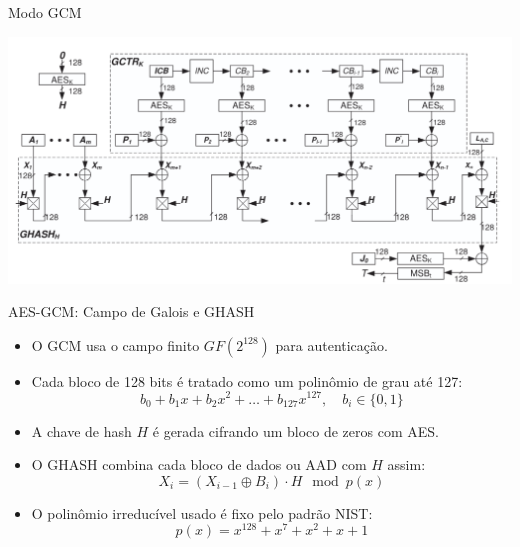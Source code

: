 \begin{frame}{Modo GCM}


    \centering
    \includegraphics[width=0.8\linewidth]{Figuras/aes-modo-gcm.png}

\end{frame}

\begin{frame}{AES-GCM: Campo de Galois e GHASH}
    \begin{itemize}
        \item O GCM usa o campo finito \(GF(2^{128})\) para autenticação.
        \item Cada bloco de 128 bits é tratado como um polinômio de grau até 127:
              \[
                  b_0 + b_1 x + b_2 x^2 + \dots + b_{127} x^{127}, \quad b_i \in \{0,1\}
              \]
        \item A chave de hash \(H\) é gerada cifrando um bloco de zeros com AES.
        \item O GHASH combina cada bloco de dados ou AAD com \(H\) assim:
              \[
                  X_i = (X_{i-1} \oplus B_i) \cdot H \mod p(x)
              \]
        \item O polinômio irreducível usado é fixo pelo padrão NIST:
              \[
                  p(x) = x^{128} + x^7 + x^2 + x + 1
              \]
    \end{itemize}
\end{frame}


